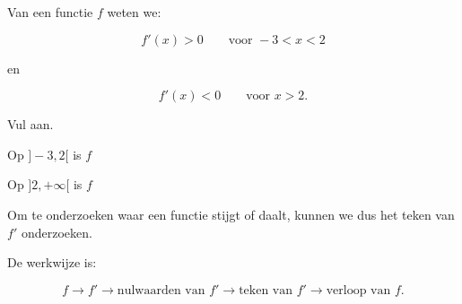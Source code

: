 \documentclass{ximera}
\begin{document}
\begin{oefening}{\oefB\ESS}

Van een functie $f$ weten we:

\[
f'(x)>0
\qquad\text{voor }-3<x<2
\]

en

\[
f'(x)<0
\qquad\text{voor }x>2.
\]

Vul aan.

\begin{question}
Op $]-3,2[$ is $f$

\begin{multipleChoice}
\end{multipleChoice}
\end{question}

\begin{question}
Op $]2,+\infty[$ is $f$

\begin{multipleChoice}
\end{multipleChoice}
\end{question}

\end{oefening}




Om te onderzoeken waar een functie stijgt of daalt, kunnen we dus
het teken van $f'$ onderzoeken.

De werkwijze is:

\[
f
\longrightarrow
f'
\longrightarrow
\text{nulwaarden van }f'
\longrightarrow
\text{teken van }f'
\longrightarrow
\text{verloop van }f.
\]
\end{document}
